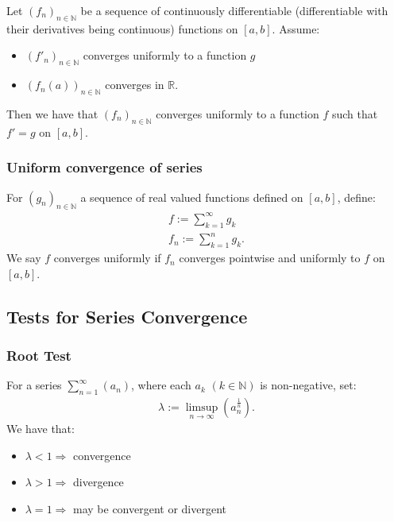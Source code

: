 \documentclass[a4paper, 12pt, twoside]{article}
\begin{document}
Let $(f_n)_{n\in\mathbb{N}}$ be a sequence of continuously differentiable
(differentiable with their derivatives being continuous) functions on $[a, b]$.
Assume:

\begin{itemize}
      \item $(f'_n)_{n\in\mathbb{N}}$ converges uniformly to a function $g$
      \item $(f_n(a))_{n\in\mathbb{N}}$ converges in $\mathbb{R}$.
\end{itemize}

Then we have that $(f_n)_{n\in\mathbb{N}}$ converges uniformly to a function
$f$ such that $f' = g$ on $[a, b]$.

\subsubsection{Uniform convergence of series}

For $(g_n)_{n\in\mathbb{N}}$ a sequence of real valued functions defined on
$[a, b]$, define:
\begin{align*}
      f := \sum_{k = 1}^\infty g_k \\
      f_n := \sum_{k = 1}^n g_k.
\end{align*}
We say $f$ converges uniformly if $f_n$ converges pointwise and uniformly to
$f$ on $[a, b]$.

\subsection{Tests for Series Convergence}

\subsubsection{Root Test}

For a series $\sum_{n = 1}^\infty(a_n)$, where each $a_k$ $(k\in\mathbb{N})$
is non-negative, set:
\begin{align*}
      \lambda := \limsup_{n\to\infty}(a_n^{\frac{1}{n}}).
\end{align*}
We have that:

\begin{itemize}
      \item $\lambda < 1 \Rightarrow$ convergence
      \item $\lambda > 1 \Rightarrow$ divergence
      \item $\lambda = 1 \Rightarrow$ may be convergent or divergent
\end{itemize}
\end{document}
